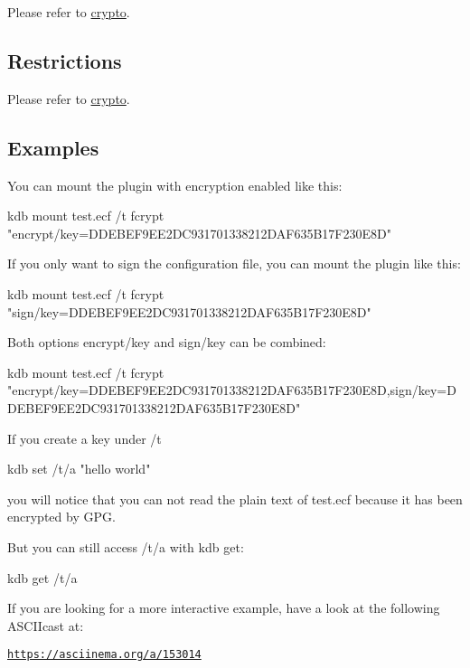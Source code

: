 Please refer to \hyperlink{md_src_plugins_crypto_README_src_plugins_crypto_README_md}{crypto}.

\subsection*{Restrictions}

Please refer to \hyperlink{md_src_plugins_crypto_README_src_plugins_crypto_README_md}{crypto}.

\subsection*{Examples}

You can mount the plugin with encryption enabled like this\+: \begin{DoxyVerb}    kdb mount test.ecf /t fcrypt "encrypt/key=DDEBEF9EE2DC931701338212DAF635B17F230E8D"
\end{DoxyVerb}


If you only want to sign the configuration file, you can mount the plugin like this\+: \begin{DoxyVerb}    kdb mount test.ecf /t fcrypt "sign/key=DDEBEF9EE2DC931701338212DAF635B17F230E8D"
\end{DoxyVerb}


Both options {\ttfamily encrypt/key} and {\ttfamily sign/key} can be combined\+: \begin{DoxyVerb}    kdb mount test.ecf /t fcrypt "encrypt/key=DDEBEF9EE2DC931701338212DAF635B17F230E8D,sign/key=DDEBEF9EE2DC931701338212DAF635B17F230E8D"
\end{DoxyVerb}


If you create a key under {\ttfamily /t} \begin{DoxyVerb}    kdb set /t/a "hello world"
\end{DoxyVerb}


you will notice that you can not read the plain text of {\ttfamily test.\+ecf} because it has been encrypted by G\+PG.

But you can still access {\ttfamily /t/a} with {\ttfamily kdb get}\+: \begin{DoxyVerb}    kdb get /t/a
\end{DoxyVerb}


If you are looking for a more interactive example, have a look at the following A\+S\+C\+I\+Icast at\+:

\href{https://asciinema.org/a/153014}{\tt https\+://asciinema.\+org/a/153014}

